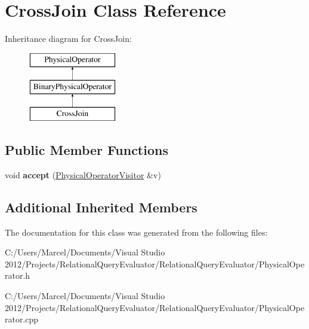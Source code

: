 \hypertarget{class_cross_join}{\section{Cross\+Join Class Reference}
\label{class_cross_join}
}
Inheritance diagram for Cross\+Join\+:\begin{figure}[H]
\begin{center}
\leavevmode
\includegraphics[height=3.000000cm]{class_cross_join}
\end{center}
\end{figure}
\subsection*{Public Member Functions}
\begin{DoxyCompactItemize}
\item 
\hypertarget{class_cross_join_a92a1a35e3940c6c8bdaa6722d476c5db}{void {\bfseries accept} (\hyperlink{class_physical_operator_visitor}{Physical\+Operator\+Visitor} \&v)}\label{class_cross_join_a92a1a35e3940c6c8bdaa6722d476c5db}

\end{DoxyCompactItemize}
\subsection*{Additional Inherited Members}


The documentation for this class was generated from the following files\+:\begin{DoxyCompactItemize}
\item 
C\+:/\+Users/\+Marcel/\+Documents/\+Visual Studio 2012/\+Projects/\+Relational\+Query\+Evaluator/\+Relational\+Query\+Evaluator/Physical\+Operator.\+h\item 
C\+:/\+Users/\+Marcel/\+Documents/\+Visual Studio 2012/\+Projects/\+Relational\+Query\+Evaluator/\+Relational\+Query\+Evaluator/Physical\+Operator.\+cpp\end{DoxyCompactItemize}
